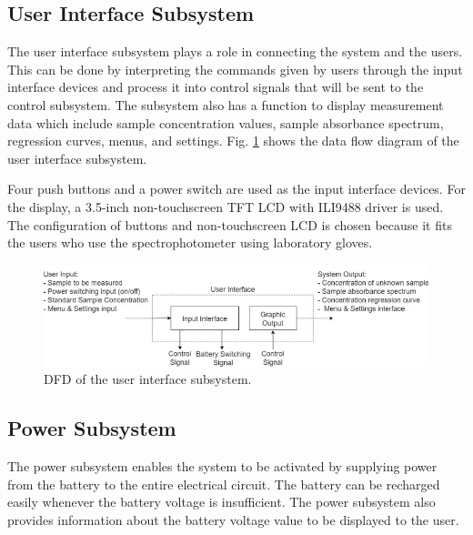 \documentclass[conference]{IEEEtran}
\begin{document}
\subsection{User Interface Subsystem}
The user interface subsystem plays a role in connecting the system and the users.
This can be done by interpreting the commands given by users through the input interface devices and process it into control signals that will be sent to the control subsystem.
The subsystem also has a function to display measurement data which include sample concentration values, sample absorbance spectrum, regression curves, menus, and settings.
Fig. \ref{ui-dfd} shows the data flow diagram of the user interface subsystem.

Four push buttons and a power switch are used as the input interface devices.
For the display, a 3.5-inch non-touchscreen TFT LCD with ILI9488 driver is used.
The configuration of buttons and non-touchscreen LCD is chosen because it fits the users who use the spectrophotometer using laboratory gloves.

    \begin{figure}[htbp]
    \centerline{\includegraphics[scale=0.43]{ui-dfd.png}}
    \caption{DFD of the user interface subsystem.}
    \label{ui-dfd}
    \end{figure}


\subsection{Power Subsystem}
The power subsystem enables the system to be activated by supplying power from the battery to the entire electrical circuit. The battery can be recharged easily whenever the battery voltage is insufficient. The power subsystem also provides information about the battery voltage value to be displayed to the user. 
\end{document}
